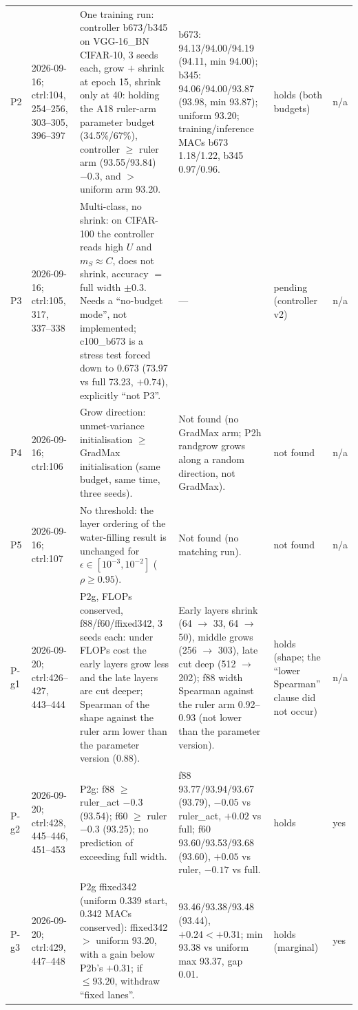 \begin{longtable}{p{1.1cm}p{1.4cm}p{6.2cm}p{4.6cm}p{2.0cm}p{1.6cm}}
P2 & 2026-09-16; ctrl:104, 254--256, 303--305, 396--397 & One training run: controller b673/b345 on VGG-16\_BN CIFAR-10, 3 seeds each, grow $+$ shrink at epoch 15, shrink only at 40: holding the A18 ruler-arm parameter budget (34.5\%/67\%), controller $\ge$ ruler arm (93.55/93.84) $- 0.3$, and $>$ uniform arm 93.20. & b673: 94.13/94.00/94.19 (94.11, min 94.00); b345: 94.06/94.00/93.87 (93.98, min 93.87); uniform 93.20; training/inference MACs b673 1.18/1.22, b345 0.97/0.96. & holds (both budgets) & n/a \\
P3 & 2026-09-16; ctrl:105, 317, 337--338 & Multi-class, no shrink: on CIFAR-100 the controller reads high $U$ and $m_S \approx C$, does not shrink, accuracy $=$ full width $\pm 0.3$. Needs a ``no-budget mode'', not implemented; c100\_b673 is a stress test forced down to 0.673 (73.97 vs full 73.23, $+0.74$), explicitly ``not P3''. & --- & pending (controller v2) & n/a \\
P4 & 2026-09-16; ctrl:106 & Grow direction: unmet-variance initialisation $\ge$ GradMax initialisation (same budget, same time, three seeds). & Not found (no GradMax arm; P2h randgrow grows along a random direction, not GradMax). & not found & n/a \\
P5 & 2026-09-16; ctrl:107 & No threshold: the layer ordering of the water-filling result is unchanged for $\epsilon \in [10^{-3}, 10^{-2}]$ ($\rho \ge 0.95$). & Not found (no matching run). & not found & n/a \\
P-g1 & 2026-09-20; ctrl:426--427, 443--444 & P2g, FLOPs conserved, f88/f60/ffixed342, 3 seeds each: under FLOPs cost the early layers grow less and the late layers are cut deeper; Spearman of the shape against the ruler arm lower than the parameter version (0.88). & Early layers shrink (64 $\to$ 33, 64 $\to$ 50), middle grows (256 $\to$ 303), late cut deep (512 $\to$ 202); f88 width Spearman against the ruler arm 0.92--0.93 (not lower than the parameter version). & holds (shape; the ``lower Spearman'' clause did not occur) & n/a \\
P-g2 & 2026-09-20; ctrl:428, 445--446, 451--453 & P2g: f88 $\ge$ ruler\_act $- 0.3$ (93.54); f60 $\ge$ ruler $- 0.3$ (93.25); no prediction of exceeding full width. & f88 93.77/93.94/93.67 (93.79), $-0.05$ vs ruler\_act, $+0.02$ vs full; f60 93.60/93.53/93.68 (93.60), $+0.05$ vs ruler, $-0.17$ vs full. & holds & yes \\
P-g3 & 2026-09-20; ctrl:429, 447--448 & P2g ffixed342 (uniform 0.339 start, 0.342 MACs conserved): ffixed342 $>$ uniform 93.20, with a gain below P2b's $+0.31$; if $\le 93.20$, withdraw ``fixed lanes''. & 93.46/93.38/93.48 (93.44), $+0.24 < +0.31$; min 93.38 vs uniform max 93.37, gap 0.01. & holds (marginal) & yes \\

\end{longtable}
